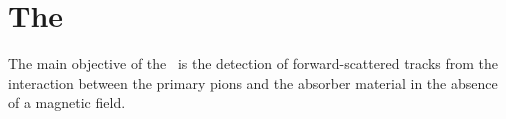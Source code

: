 

\section{The \tfa}
\label{sec:track}


The main objective of the \tfa\  is the detection of forward-scattered tracks from the interaction between the primary pions and the absorber material in the absence of a magnetic field.

